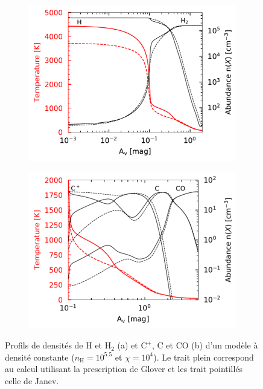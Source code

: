 \begin{figure}[!h]
    \centering
    \begin{subfigure}[t]{0.49\textwidth} %
        \centering \includegraphics[trim = {0 0 0 0 },clip,width=1\textwidth]{figure/H2/bosse_dcte_janevVSglover/profilT.pdf}
        \caption{}
        \label{fig:H2:bosse:plotH}
    \end{subfigure}
    \begin{subfigure}[t]{0.49\textwidth}
        \centering \includegraphics[trim = {0 0 0 0 },clip,width=1\textwidth]{figure/H2/bosse_dcte_janevVSglover/Cp_C_CO.pdf}
        \caption{}
    \label{fig:H2:bosse:plotC}
    \end{subfigure}
    \caption{Profils de densités de $\mathrm{H}$ et $\mathrm{H}_2$ (a) et $\mathrm{C}^+$, $\mathrm{C}$ et $\mathrm{CO}$ (b) d'un modèle à densité constante ($n_\mathrm{H} = 10^{5.5}$ et $\chi = 10^4$). Le trait plein correspond au calcul utilisant la prescription de Glover et les trait pointillés celle de Janev.}
    
\end{figure}


